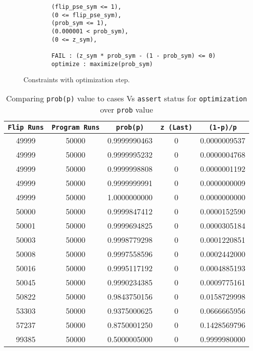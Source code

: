 \documentclass[usenames,dvipsnames,acmsmall]{acmart}
\begin{document}
	\begin{figure}
		\begin{verbatim}
		(flip_pse_sym <= 1),
		(0 <= flip_pse_sym),
		(prob_sym <= 1),
		(0.000001 < prob_sym),
		(0 <= z_sym),
		
		FAIL : (z_sym * prob_sym - (1 - prob_sym) <= 0)
		optimize : maximize(prob_sym)
		\end{verbatim}
		\caption{Constraints with optimization step.}
	\end{figure}
	\begin{table}
		\centering
		\caption{Comparing \texttt{prob(p)} value to cases Vs \texttt{assert} status for \texttt{optimization} over \texttt{prob} value}
		\label{}
		\begin{tabular}{ c | c | c | c | c } 
			\toprule
			\texttt{Flip Runs} & \texttt{Program Runs}& \texttt{prob(p)} & \texttt{z (Last)} & \texttt{(1-p)/p} \\ 
			\hline\hline
			49999 & 50000 & 0.9999990463 & 0 & 0.0000009537 \\ \hline 
			49999 & 50000 & 0.9999995232 & 0 & 0.0000004768 \\ \hline 
			49999 & 50000 & 0.9999998808 & 0 & 0.0000001192 \\ \hline 
			49999 & 50000 & 0.9999999991 & 0 & 0.0000000009 \\ \hline 
			49999 & 50000 & 1.0000000000 & 0 & 0.0000000000 \\ \hline 
			50000 & 50000 & 0.9999847412 & 0 & 0.0000152590 \\ \hline 
			50001 & 50000 & 0.9999694825 & 0 & 0.0000305184 \\ \hline 
			50003 & 50000 & 0.9998779298 & 0 & 0.0001220851 \\ \hline 
			50008 & 50000 & 0.9997558596 & 0 & 0.0002442000 \\ \hline 
			50016 & 50000 & 0.9995117192 & 0 & 0.0004885193 \\ \hline 
			50045 & 50000 & 0.9990234385 & 0 & 0.0009775161 \\ \hline 
			50822 & 50000 & 0.9843750156 & 0 & 0.0158729998 \\ \hline 
			53303 & 50000 & 0.9375000625 & 0 & 0.0666665956 \\ \hline 
			57237 & 50000 & 0.8750001250 & 0 & 0.1428569796 \\ \hline 
			99385 & 50000 & 0.5000005000 & 0 & 0.9999980000 \\ \hline 
			\bottomrule
		\end{tabular}
	\end{table}
\end{document}
